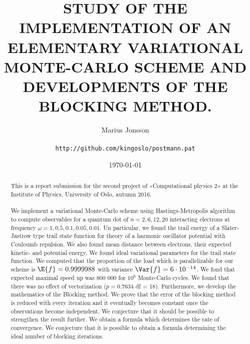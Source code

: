 \documentclass[11pt,english,a4paper]{article}
\author{\normalsize Marius Jonsson \\\\
\vspace{5px}
\normalsize \texttt{http://github.com/kingoslo/postmann.pat}}
\title{\bf \uppercase{Study of the implementation of an elementary variational monte-carlo scheme and developments of the blocking method.}}
\date{\normalsize \today}
\begin{document}
\maketitle
\begin{abstract} \normalsize This is a report submission for the second project of «Computational physics 2» at the Institute of Physics, University of Oslo, autumn 2016.\\
\\
We implement a variational Monte-Carlo scheme using Hastings-Metropolis algorithm to compute observables for a quantum dot of $n=2,6,12,20$ interacting electrons at frequency $\omega = 1,0.5,0.1,0.05,0.01$. Un particular, we found the trail energy of a Slater-Jastrow type trail state function for theory of a harmonic oscillator potential with Couloumb repulsion. We also found mean distance between electrons, their expected kinetic- and potential energy. We found ideal variational parameters for the trail state function. We computed that the proportion of the load which is parallelizable for our scheme is $\E{f} = 0.9999988$ with variance $\Var{f} = 6 \cdot 10^{-14}$. We fond that expected maximal speed up was 800 000 for $10^{6}$ Monte-Carlo cycles. We found that there was no effect of vectorization ($p=0.7634$ df = 18). Furthermore, we develop the mathematics of the Blocking method. We prove that the error of the blocking method is reduced with every iteration and it eventually becomes constant once the observations become independent. We conjecture that it should be possible to strengthen the result further. We obtain a formula which determines the rate of convergence. We conjecture that it is possible to obtain a formula determining the ideal number of blocking iterations.
\end{abstract}
\end{document}

